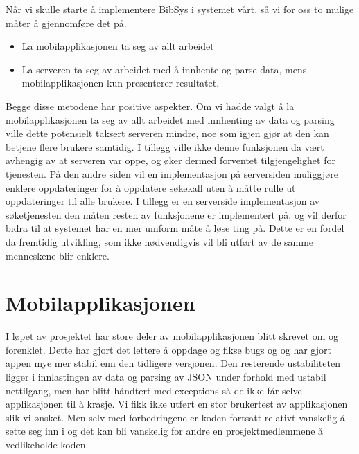 \documentclass[../main.tex]{subfiles}
\begin{document}
Når vi skulle starte å implementere BibSys i systemet vårt, så vi for oss to mulige måter å gjennomføre det på.
\begin{itemize}
\item La mobilapplikasjonen ta seg av allt arbeidet
\item La serveren ta seg av arbeidet med å innhente og parse data, mens mobilapplikasjonen kun presenterer resultatet.
\end{itemize}
Begge disse metodene har positive aspekter. Om vi hadde valgt å la mobilapplikasjonen ta seg av allt arbeidet med innhenting av data og parsing ville dette potensielt taksert serveren mindre, noe som igjen gjør at den kan betjene flere brukere samtidig. I tillegg ville ikke denne funksjonen da vært avhengig av at serveren var oppe, og øker dermed forventet tilgjengelighet for tjenesten.
På den andre siden vil en implementasjon på serversiden muliggjøre enklere oppdateringer for å oppdatere søkekall uten å måtte rulle ut oppdateringer til alle brukere. I tillegg er en serverside implementasjon av søketjenesten den måten resten av funksjonene er implementert på, og vil derfor bidra til at systemet har en mer uniform måte å løse ting på. Dette er en fordel da fremtidig utvikling, som ikke nødvendigvis vil bli utført av de samme menneskene blir enklere.

\section{Mobilapplikasjonen}
I løpet av prosjektet har store deler av mobilapplikasjonen blitt skrevet om og forenklet. Dette har gjort det lettere å oppdage og fikse bugs og og har gjort appen mye mer stabil enn den tidligere versjonen. Den resterende ustabiliteten ligger i innlastingen av data og parsing av JSON under forhold med ustabil nettilgang, men har blitt håndtert med exceptions så de ikke får selve applikasjonen til å krasje. Vi fikk ikke utført en stor brukertest av applikasjonen slik vi ønsket. Men selv med forbedringene er koden fortsatt relativt vanskelig å sette seg inn i og det kan bli vanskelig for andre en prosjektmedlemmene å vedlikeholde koden.
\end{document}
